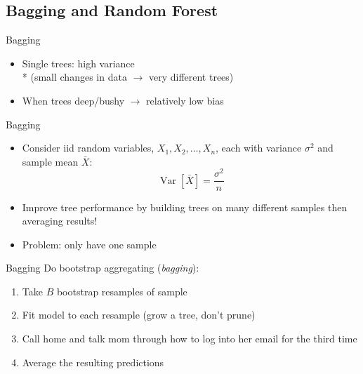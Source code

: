 \documentclass[handout]{beamer}
\begin{document}

\subsection{Bagging and Random Forest} %
\label{sub:bagging_and_random}

\begin{frame}{Bagging}
  
  \begin{itemize}[<+->]
    \item Single trees: high variance \\* 
    (small changes in data $\rightarrow$ very different trees)
    \item When trees deep/bushy $\rightarrow$ relatively low bias 
  \end{itemize}
\end{frame}

\begin{frame}{Bagging}
  \begin{itemize}[<+->]
    \item Consider iid random variables, $X_{1}, X_{2}, \ldots, X_{n}$, each with variance $\sigma^2$ and sample mean $\bar{X}$:
  \begin{equation*}
    \operatorname{Var}[\bar{X}] = \frac{\sigma^2}{n}
  \end{equation*}
  \item Improve tree performance by building trees on many different samples then averaging results!
  \item Problem: only have one sample
  \end{itemize}
\end{frame}

\begin{frame}[c]{Bagging}
  Do bootstrap aggregating (\emph{bagging}):
  \begin{enumerate}[<+->]
    \item Take $B$ bootstrap resamples of sample
    \item Fit model to each resample (grow a tree, don't prune)
    \item Call home and talk mom through how to log into her email for the third time
    \item Average the resulting predictions
  \end{enumerate}
\end{frame}
\end{document}
